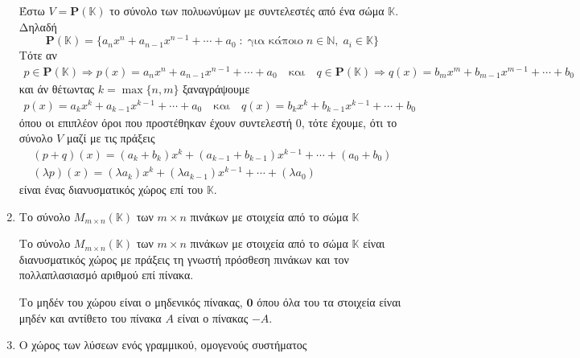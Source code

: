 \begin{examples}
\begin{enumerate}
            Έστω $ V = \mathbf{P}(\mathbb{K}) $ το σύνολο των πολυωνύμων  
            με συντελεστές από ένα σώμα $ \mathbb{K} $. Δηλαδή 
            \[
                \mathbf{P}(\mathbb{K}) = \{ a_{n}x^{n}+a_{n-1}x^{n-1}+\cdots + a_{0} \; 
                : \; \text{για κάποιο} \; n \in \mathbb{N}, \; a_{i} \in \mathbb{K}\}  
            \] 
            Τότε αν 
            \begin{gather*}
                p \in \mathbf{P}(\mathbb{K}) \Rightarrow p(x)
                = a_{n}x^{n}+a_{n-1}x^{n-1}+\cdots + a_{0} \quad \text{και} 
                \quad q \in \mathbf{P}(\mathbb{K}) \Rightarrow 
                q(x) = b_{m}x^{m}+b_{m-1}x^{m-1}+\cdots + b_{0} 
            \end{gather*} 
            και άν θέτωντας $ k = \max \{ n,m \} $ ξαναγράψουμε 
            \begin{gather*}
                p(x) = a_{k}x^{k}+a_{k-1}x^{k-1}+\cdots + a_{0} \quad \text{και} \quad
                q(x) = b_{k}x^{k}+b_{k-1}x^{k-1}+\cdots + b_{0} 
            \end{gather*}
            όπου οι επιπλέον όροι που προστέθηκαν έχουν συντελεστή 0, τότε έχουμε, 
            ότι το σύνολο $ V $ μαζί με τις πράξεις 
            \begin{gather*}
                (p+q)(x) = (a_{k}+ b_{k})x^{k} + 
                (a_{k-1}+b_{k-1})x^{k-1}+ \cdots + (a_{0}+ b_{0}) \\
                (\lambda p)(x) = (\lambda a_{k})x^{k}+
                ( \lambda a_{k-1})x^{k-1}+ \cdots + ( \lambda a_{0})
            \end{gather*} 
            είναι ένας διανυσματικός χώρος επί του $ \mathbb{K} $.

        \item \label{ex:mat} \textcolor{Col2}{Το σύνολο $ M_{m \times n}(\mathbb{K}) $ 
            των $ m \times n $ πινάκων με στοιχεία από το σώμα $ \mathbb{K} $}

            Το σύνολο $ M_{m \times n}(\mathbb{K}) $ των $ m \times n $ πινάκων 
            με στοιχεία από το σώμα $ \mathbb{K} $ είναι διανυσματικός χώρος 
            με πράξεις τη γνωστή πρόσθεση πινάκων και τον πολλαπλασιασμό 
            αριθμού επί πίνακα.

            Το μηδέν του χώρου είναι ο μηδενικός πίνακας, $ \mathbf{0} $ όπου 
            όλα του τα στοιχεία είναι μηδέν και αντίθετο του πίνακα $A$ είναι 
            ο πίνακας $ -A $.

        \item \textcolor{Col2}{Ο χώρος των λύσεων ενός γραμμικού, ομογενούς 
            συστήματος}


\end{enumerate}
\end{examples}
